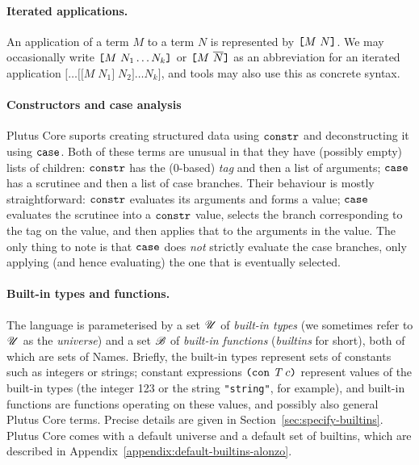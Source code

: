 \paragraph{Iterated applications.}
An application of a term $M$ to a term $N$ is represented by
$\texttt{[} M ~ N \texttt{]}$. We may occasionally write
$\texttt{[} M ~ N_1 \ldots N_k \texttt{]}$ or
$\texttt{[} M ~ \overline{N} \texttt{]}$ as an abbreviation for an iterated application
$\mathtt{[}\ldots\mathtt{[[}M\;N_1\mathtt{]}\;N_2\mathtt{]}\ldots N_k\mathtt{]}$,
and tools may also use this as concrete syntax.

\paragraph{Constructors and case analysis}
Plutus Core suports creating structured data using $\texttt{constr}$ and deconstructing
it using $\texttt{case}$. Both of these terms are unusual in that they have (possibly
empty) lists of children: $\texttt{constr}$ has the (0-based) \emph{tag} and then a list of arguments;
$\texttt{case}$ has a scrutinee and then a list of case branches. Their behaviour is mostly
straightforward: $\texttt{constr}$ evaluates its arguments and forms a value; $\texttt{case}$
evaluates the scrutinee into a $\texttt{constr}$ value, selects the branch corresponding to
the tag on the value, and then applies that to the arguments in the value. The only thing
to note is that $\texttt{case}$ does \emph{not} strictly evaluate the case branches, only
applying (and hence evaluating) the one that is eventually selected.

\paragraph{Built-in types and functions.} The language is parameterised by a set $\mathscr{U}$ of
\textit{built-in types} (we sometimes refer to $\mathscr{U}$ as the
\textit{universe}) and a set $\mathscr{B}$ of \textit{built-in functions}
(\textit{builtins} for short), both of which are sets of Names.
Briefly, the built-in types represent sets of constants such as
integers or strings; constant expressions $\texttt{(} \texttt{con} ~ \textit{T} ~ c \texttt{)}$ represent
values of the built-in types (the integer 123 or the string
\texttt{"string"}, for example), and built-in functions are functions
operating on these values, and possibly also general Plutus Core
terms.  Precise details are given in
Section~\ref{sec:specify-builtins}.  Plutus Core comes with a default
universe and a default set of builtins, which are described in
Appendix~\ref{appendix:default-builtins-alonzo}.%

